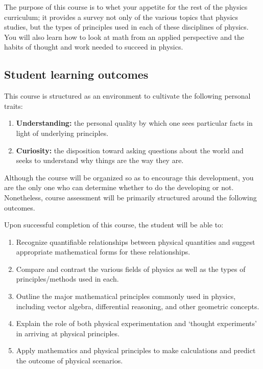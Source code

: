 \documentclass{syllabus}
\begin{document}
The purpose of this course is to whet your appetite for the rest of the physics curriculum; it provides a survey not only of the various topics that physics studies, but the types of principles used in each of these disciplines of physics. You will also learn how to look at math from an applied perspective and the habits of thought and work needed to succeed in physics. 


\subsection*{Student learning outcomes} 

This course is structured as an environment to cultivate the following personal traits:
\begin{enumerate}
    \item \textbf{Understanding:} the personal quality by which one sees particular facts in light of underlying principles.
    \item \textbf{Curiosity:} the disposition toward asking questions about the world and seeks to understand why things are the way they are.
\end{enumerate}
Although the course will be organized so as to encourage this development, you are the only one who can determine whether to do the developing or not. Nonetheless, course assessment will be primarily structured around the following outcomes. 


Upon successful completion of this course, the student will be able to:
\begin{enumerate}[label=\textcolor{CarthageDark}{\bfseries\arabic*.}]
    \item Recognize quantifiable relationships between physical quantities and suggest appropriate mathematical forms for these relationships.
    \item Compare and contrast the various fields of physics as well as the types of principles/methods used in each.
    \item Outline the major mathematical principles commonly used in physics, including vector algebra, differential reasoning, and other geometric concepts.
    \item Explain the role of both physical experimentation and `thought experiments' in arriving at physical principles.
    \item Apply mathematics and physical principles to make calculations and predict the outcome of physical scenarios.
\end{enumerate}
\end{document}
